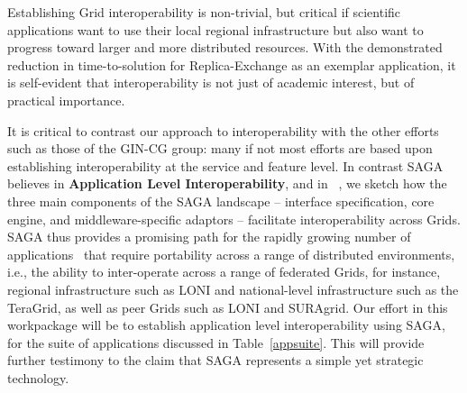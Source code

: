 \documentclass[10pt,letterpaper]{article}
\begin{document}
 Establishing Grid interoperability is
non-trivial, but critical if scientific applications want to
use their local regional infrastructure but also want to
progress toward larger and more distributed resources.
With the demonstrated reduction in time-to-solution for
Replica-Exchange as an exemplar application, it is self-evident
that interoperability is not just of academic interest, but of
practical importance.

It is critical to contrast our approach to interoperability with
the other efforts such as those of the GIN-CG group: many if not
most efforts are based upon establishing interoperability at the
service and feature level. In contrast SAGA believes in {\bf
Application Level Interoperability}, and in ~\cite{saga_gin07}, we sketch how the three main components
of the SAGA landscape -- interface specification, core engine,
and middleware-specific adaptors -- facilitate interoperability
across Grids.  SAGA thus provides a promising path for the
rapidly growing number of applications~\cite{clade06,
cc07_spice} that require portability across a range of
distributed environments, i.e., the ability to inter-operate
across a range of federated Grids, for instance, regional infrastructure
such as LONI and national-level infrastructure such as the
TeraGrid, as well as peer Grids such as LONI and SURAgrid.  Our
effort in this workpackage will be to establish application
level interoperability using SAGA, for the suite of applications
discussed in Table~\ref{appsuite}.  This will provide further
testimony to the claim that SAGA represents a simple yet
strategic technology.\\[-0.5em]



\end{document}
